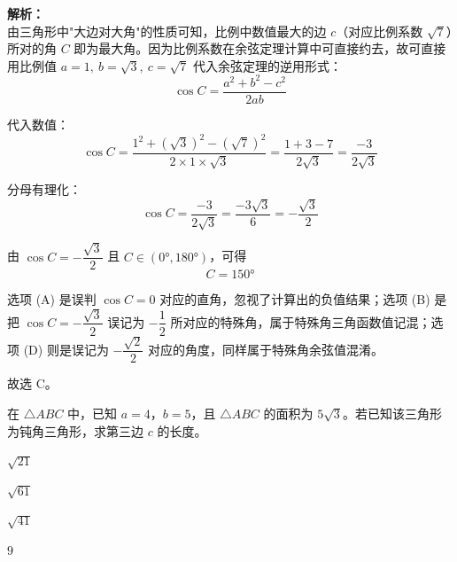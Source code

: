 \documentclass[12pt,a4paper]{exam-zh}
\begin{document}
\begin{solution}
    \textbf{解析：} \\
    由三角形中"大边对大角"的性质可知，比例中数值最大的边 $c$（对应比例系数 $\sqrt{7}$）所对的角 $C$ 即为最大角。因为比例系数在余弦定理计算中可直接约去，故可直接用比例值 $a=1,\ b=\sqrt{3},\ c=\sqrt{7}$ 代入余弦定理的逆用形式：
    \[ \displaystyle \cos C = \frac{a^2 + b^2 - c^2}{2ab} \]

    代入数值：
    \[ \displaystyle \cos C = \frac{1^2 + (\sqrt{3})^2 - (\sqrt{7})^2}{2 \times 1 \times \sqrt{3}} = \frac{1 + 3 - 7}{2\sqrt{3}} = \frac{-3}{2\sqrt{3}} \]

    分母有理化：
    \[ \displaystyle \cos C = \frac{-3}{2\sqrt{3}} = \frac{-3\sqrt{3}}{6} = -\frac{\sqrt{3}}{2} \]

    由 $\cos C = -\dfrac{\sqrt{3}}{2}$ 且 $C \in (0°, 180°)$，可得
    \[ \displaystyle C = 150° \]

    选项 (A) 是误判 $\cos C = 0$ 对应的直角，忽视了计算出的负值结果；选项 (B) 是把 $\cos C = -\dfrac{\sqrt3}{2}$ 误记为 $-\dfrac12$ 所对应的特殊角，属于特殊角三角函数值记混；选项 (D) 则是误记为 $-\dfrac{\sqrt2}{2}$ 对应的角度，同样属于特殊角余弦值混淆。

    故选 C。
\end{solution}

\begin{question}
    在 $\triangle ABC$ 中，已知 $a = 4$，$b = 5$，且 $\triangle ABC$ 的面积为 $5\sqrt{3}$。若已知该三角形为钝角三角形，求第三边 $c$ 的长度。\paren[B]
    \begin{choices}
        \item $\sqrt{21}$
        \item $\sqrt{61}$
        \item $\sqrt{41}$
        \item $9$
    \end{choices}
\end{question}
\end{document}
